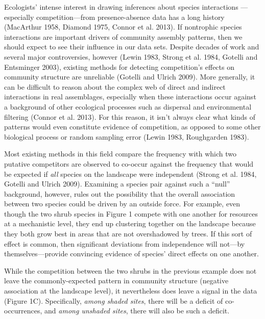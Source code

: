 \documentclass[12pt,]{article}
\begin{document}
\begin{spacing}{1.9}
\begin{flushleft}
Ecologists' intense interest in drawing inferences about species
interactions ---especially competition---from presence-absence data has
a long history (MacArthur 1958, Diamond 1975, Connor et al. 2013). If
nontrophic species interactions are important drivers of community
assembly patterns, then we should expect to see their influence in our
data sets. Despite decades of work and several major controversies,
however (Lewin 1983, Strong et al. 1984, Gotelli and Entsminger 2003),
existing methods for detecting competition's effects on community
structure are unreliable (Gotelli and Ulrich 2009). More generally, it
can be difficult to reason about the complex web of direct and indirect
interactions in real assemblages, especially when these interactions
occur against a background of other ecological processes such as
dispersal and environmental filtering (Connor et al. 2013). For this
reason, it isn't always clear what kinds of patterns would even
constitute evidence of competition, as opposed to some other biological
process or random sampling error (Lewin 1983, Roughgarden 1983).

Most existing methods in this field compare the frequency with which two
putative competitors are observed to co-occur against the frequency that
would be expected if \emph{all} species on the landscape were
independent (Strong et al. 1984, Gotelli and Ulrich 2009). Examining a
species pair against such a ``null'' background, however, rules out the
possibility that the overall association between two species could be
driven by an outside force. For example, even though the two shrub
species in Figure 1 compete with one another for resources at a
mechanistic level, they end up clustering together on the landscape
because they both grow best in areas that are not overshadowed by trees.
If this sort of effect is common, then significant deviations from
independence will not---by themselves---provide convincing evidence of
species' direct effects on one another.

While the competition between the two shrubs in the previous example
does not leave the commonly-expected pattern in community structure
(negative association at the landscape level), it nevertheless does
leave a signal in the data (Figure 1C). Specifically, \emph{among shaded
sites}, there will be a deficit of co-occurrences, and \emph{among
unshaded sites}, there will also be such a deficit.


\end{flushleft}
\end{spacing}
\end{document}
